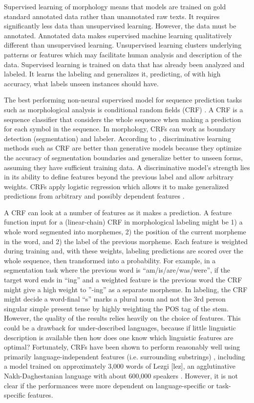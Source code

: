 \documentclass[12pt]{article}
\begin{document}
Supervised learning of morphology means that models are trained on gold standard annotated data rather than unannotated raw texts. It requires significantly less data than unsupervised learning. However, the data must be annotated. Annotated data makes supervised machine learning qualitatively different than unsupervised learning. Unsupervised learning clusters underlying patterns or features which may facilitate human analysis and description of the data. Supervised learning is trained on data that has already been analyzed and labeled. It learns the labeling and generalizes it, predicting, of with high accuracy, what labels unseen instances should have. 

The best performing non-neural supervised model for sequence prediction tasks such as morphological analysis is conditional random fields (CRF) \cite{lafferty_conditional_2001,muller_efficient_2013,ruokolainen_comparative_2016}. A CRF is a sequence classifier that considers the whole sequence when making a prediction for each symbol in the sequence. In morphology, CRFs can work as boundary detection (segmentation) and labeler. According to , discriminative learning methods such as CRF are better than generative models because they optimize the accuracy of segmentation boundaries and generalize better to unseen forms, assuming they have sufficient training data. A discriminative model's strength lies in its ability to define features beyond the previous label and allow arbitrary weights. CRFs apply logistic regression which allows it to make generalized predictions from arbitrary and possibly dependent features \cite{ruokolainen_supervised_2013}. 

A CRF can look at a number of features as it makes a prediction. A feature function input for a (linear-chain) CRF in morphological labeling might be 1) a whole word segmented into morphemes, 2) the position of the current morpheme in the word, and 2) the label of the previous morpheme. Each feature is weighted during training and, with these weights, labeling predictions are scored over the whole sequence, then transformed into a probability. For example, in a segmentation task where the previous word is ``am/is/are/was/were'', if the target word ends in ``ing'' and a weighted feature is the previous word the CRF might give a high weight to ''-ing'' as a separate morpheme. In labeling, the CRF might decide a word-final ``s'' marks a plural noun and not the 3rd person singular simple present tense by highly weighting the POS tag of the stem. However, the quality of the results relies heavily on the choice of features. This could be a drawback for under-described languages, because if little linguistic description is available then how does one know which linguistic features are optimal? Fortunately, CRFs have been shown to perform reasonably well using primarily language-independent features (i.e. surrounding substrings) \cite{ruokolainen_comparative_2016,moeller_automatic_2018}, including a model trained on approximately 3,000 words of Lezgi [lez], an agglutinative Nakh-Daghestanian language with about 600,000 speakers \cite{simons_ethnologue:_2018}. However, it is not  clear if the performances were more dependent on language-specific or task-specific features.
\end{document}

